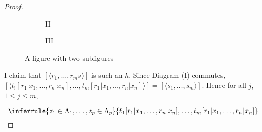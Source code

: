 \begin{proof}
    \begin{figure}
    \centering
    \begin{subfigure}{.5\textwidth}
      \centering
      \caption{II}
      \label{diag:2.7-II}
    \end{subfigure}%
    \begin{subfigure}{.5\textwidth}
      \centering
      \caption{III}
      \label{diag:2.7-II}
    \end{subfigure}
    \caption{A figure with two subfigures}
    \label{fig:test}
  \end{figure}

  I claim that \([\langle r_1, \ldots, r_m s \rangle]\) is such an \(h\).
  Since Diagram (I) commutes, \([\langle t_![r_1|x_1, \ldots, r_n|x_n], \ldots, t_m[r_1|x_1, \ldots, r_n|x_n] \rangle] = [\langle s_1,\ldots, s_m \rangle]\).
  Hence for all \(j\), \(1 \leq j \leq m\),

  \[
    \inferrule{z_1 \in \Lambda_1, \ldots, z_p \in \Lambda_p}{t_1[r_1|x_1, \ldots, r_n|x_n], \ldots, t_m[r_1|x_1, \ldots, r_n|x_n]}
  \]


\end{proof}
